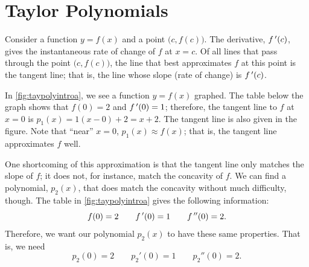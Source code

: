\section{Taylor Polynomials}\label{sec:taylor_poly}

Consider a function $y=f(x)$ and a point $\bigl(c,f(c)\bigr)$. The derivative, $f\,'(c)$, gives the instantaneous rate of change of $f$ at $x=c$. Of all lines that pass through the point $\bigl(c,f(c)\bigr)$, the line that best approximates $f$ at this point is the tangent line; that is, the line whose slope (rate of change) is $f\,'(c)$.


In \autoref{fig:taypolyintroa}, we see a function $y=f(x)$ graphed. The table below the graph shows that $f(0)=2$ and $f\,'(0) = 1$; therefore, the tangent line to $f$ at $x=0$ is $p_1(x) = 1(x-0)+2 = x+2$. The tangent line is also given in the figure. Note that ``near'' $x=0$, $p_1(x) \approx f(x)$; that is, the tangent line approximates $f$ well.

One shortcoming of this approximation is that the tangent line only matches the slope of $f$; it does not, for instance, match the concavity of $f$. We can find a polynomial, $p_2(x)$, that does match the concavity without much difficulty, though. The table in \autoref{fig:taypolyintroa} gives the following information:
\[f(0) = 2 \qquad f\,'(0) = 1\qquad f\,''(0) = 2.\]
Therefore, we want our polynomial $p_2(x)$ to have these same properties. That is, we need
\[p_2(0) = 2 \qquad p_2'(0) = 1 \qquad p_2''(0) = 2.\]

